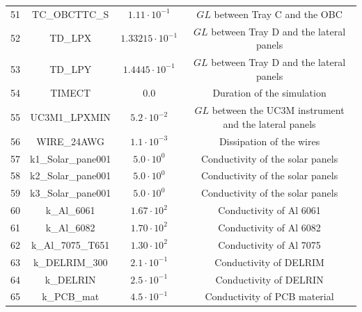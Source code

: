 \begin{table}[H]
{\begin{tabular}{cccc}
    51 & TC\_OBCTTC\_S & $1.11 \cdot 10^{-1}$ & $GL$ between Tray C and the OBC \\
    52 & TD\_LPX & $1.33215 \cdot 10^{-1}$ & $GL$ between Tray D and the lateral panels \\
    53 & TD\_LPY & $1.4445 \cdot 10^{-1}$ & $GL$ between Tray D and the lateral panels \\
    54 & TIMECT & $0.0$ & Duration of the simulation \\
    55 & UC3M1\_LPXMIN & $5.2 \cdot 10^{-2}$ & $GL$ between the UC3M instrument and the lateral panels \\
    56 & WIRE\_24AWG & $1.1 \cdot 10^{-3}$ & Dissipation of the wires \\
    57 & k1\_Solar\_pane001 & $5.0 \cdot 10^{0}$ & Conductivity of the solar panels \\
    58 & k2\_Solar\_pane001 & $5.0 \cdot 10^{0}$ & Conductivity of the solar panels \\
    59 & k3\_Solar\_pane001 & $5.0 \cdot 10^{0}$ & Conductivity of the solar panels \\
    60 & k\_Al\_6061 & $1.67 \cdot 10^{2}$ & Conductivity of Al 6061 \\
    61 & k\_Al\_6082 & $1.70 \cdot 10^{2}$ & Conductivity of Al 6082 \\
    62 & k\_Al\_7075\_T651 & $1.30 \cdot 10^{2}$ & Conductivity of Al 7075 \\
    63 & k\_DELRIM\_300 & $2.1 \cdot 10^{-1}$ & Conductivity of DELRIM \\
    64 & k\_DELRIN & $2.5 \cdot 10^{-1}$ & Conductivity of DELRIN \\
    65 & k\_PCB\_mat & $4.5 \cdot 10^{-1}$ & Conductivity of PCB material \\

    \hline
\end{tabular}%
}
\end{table}

